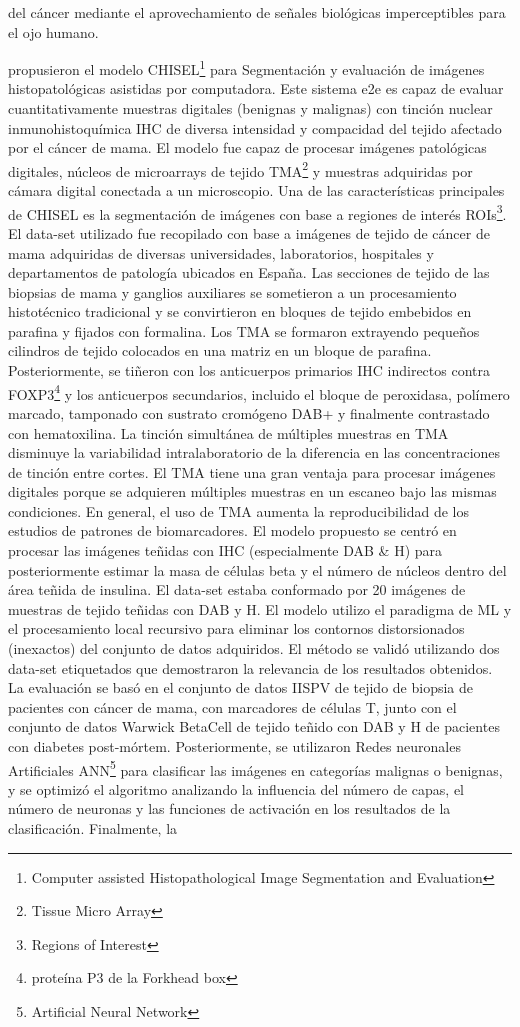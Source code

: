 del cáncer mediante el aprovechamiento de señales biológicas imperceptibles para el ojo humano.

\cite{Roszkowiak2021} propusieron el modelo CHISEL\footnote{Computer assisted Histopathological Image Segmentation and Evaluation} para Segmentación y evaluación de imágenes histopatológicas asistidas por computadora. Este sistema e2e es capaz de evaluar cuantitativamente muestras digitales (benignas y malignas) con tinción nuclear inmunohistoquímica IHC de diversa intensidad y compacidad del tejido afectado por el cáncer de mama. El modelo fue capaz de procesar imágenes patológicas digitales, núcleos de microarrays de tejido TMA\footnote{Tissue Micro Array} y muestras adquiridas por cámara digital conectada a un microscopio. Una de las características principales de CHISEL es la segmentación de imágenes con base a regiones de interés ROIs\footnote{Regions of Interest}. El data-set utilizado fue recopilado con base a imágenes de tejido de cáncer de mama adquiridas de diversas universidades, laboratorios, hospitales y departamentos de patología ubicados en España. Las secciones de tejido de las biopsias de mama y ganglios auxiliares se sometieron a un procesamiento histotécnico tradicional y se convirtieron en bloques de tejido embebidos en parafina y fijados con formalina. Los TMA se formaron extrayendo pequeños cilindros de tejido colocados en una matriz en un bloque de parafina. Posteriormente, se tiñeron con los anticuerpos primarios IHC indirectos contra FOXP3\footnote{proteína P3 de la Forkhead box} y los anticuerpos secundarios, incluido el bloque de peroxidasa, polímero marcado, tamponado con sustrato cromógeno DAB+ y finalmente contrastado con hematoxilina. La tinción simultánea de múltiples muestras en TMA disminuye la variabilidad intralaboratorio de la diferencia en las concentraciones de tinción entre cortes. El TMA tiene una gran ventaja para procesar imágenes digitales porque se adquieren múltiples muestras en un escaneo bajo las mismas condiciones. En general, el uso de TMA aumenta la reproducibilidad de los estudios de patrones de biomarcadores. El modelo propuesto se centró en procesar las imágenes teñidas con IHC (especialmente DAB \& H) para posteriormente estimar la masa de células beta y el número de núcleos dentro del área teñida de insulina. El data-set estaba conformado por 20 imágenes de muestras de tejido teñidas con DAB y H. El modelo utilizo el paradigma de ML y el procesamiento local recursivo para eliminar los contornos distorsionados (inexactos) del conjunto de datos adquiridos. El método se validó utilizando dos data-set etiquetados que demostraron la relevancia de los resultados obtenidos. La evaluación se basó en el conjunto de datos IISPV de tejido de biopsia de pacientes con cáncer de mama, con marcadores de células T, junto con el conjunto de datos Warwick BetaCell de tejido teñido con DAB y H de pacientes con diabetes post-mórtem. Posteriormente, se utilizaron Redes neuronales Artificiales ANN\footnote{Artificial Neural Network} para clasificar las imágenes en categorías malignas o benignas, y se optimizó el algoritmo analizando la influencia del número de capas, el número de neuronas y las funciones de activación en los resultados de la clasificación. Finalmente, la 